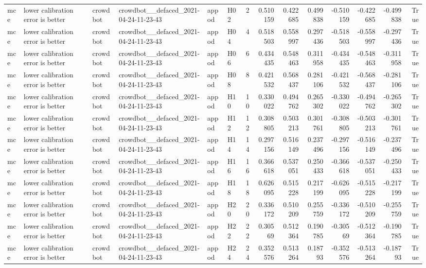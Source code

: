 \begin{longtable}{llllllrrrrrrrr}
mce & lower calibration error is better & crowdbot & crowdbot\_\_defaced\_2021-04-24-11-23-43 & appod & H02 & 2 & 0.510159 & 0.422685 & 0.499838 & -0.510159 & -0.422685 & -0.499838 & True \\
mce & lower calibration error is better & crowdbot & crowdbot\_\_defaced\_2021-04-24-11-23-43 & appod & H04 & 4 & 0.518503 & 0.558997 & 0.297436 & -0.518503 & -0.558997 & -0.297436 & True \\
mce & lower calibration error is better & crowdbot & crowdbot\_\_defaced\_2021-04-24-11-23-43 & appod & H06 & 6 & 0.434435 & 0.548463 & 0.311958 & -0.434435 & -0.548463 & -0.311958 & True \\
mce & lower calibration error is better & crowdbot & crowdbot\_\_defaced\_2021-04-24-11-23-43 & appod & H08 & 8 & 0.421532 & 0.568437 & 0.281106 & -0.421532 & -0.568437 & -0.281106 & True \\
mce & lower calibration error is better & crowdbot & crowdbot\_\_defaced\_2021-04-24-11-23-43 & appod & H10 & 10 & 0.330022 & 0.494762 & 0.265302 & -0.330022 & -0.494762 & -0.265302 & True \\
mce & lower calibration error is better & crowdbot & crowdbot\_\_defaced\_2021-04-24-11-23-43 & appod & H12 & 12 & 0.308805 & 0.503213 & 0.301761 & -0.308805 & -0.503213 & -0.301761 & True \\
mce & lower calibration error is better & crowdbot & crowdbot\_\_defaced\_2021-04-24-11-23-43 & appod & H14 & 14 & 0.297156 & 0.516149 & 0.237496 & -0.297156 & -0.516149 & -0.237496 & True \\
mce & lower calibration error is better & crowdbot & crowdbot\_\_defaced\_2021-04-24-11-23-43 & appod & H16 & 16 & 0.366618 & 0.537051 & 0.250433 & -0.366618 & -0.537051 & -0.250433 & True \\
mce & lower calibration error is better & crowdbot & crowdbot\_\_defaced\_2021-04-24-11-23-43 & appod & H18 & 18 & 0.626095 & 0.515228 & 0.217199 & -0.626095 & -0.515228 & -0.217199 & True \\
mce & lower calibration error is better & crowdbot & crowdbot\_\_defaced\_2021-04-24-11-23-43 & appod & H20 & 20 & 0.336172 & 0.510209 & 0.255759 & -0.336172 & -0.510209 & -0.255759 & True \\
mce & lower calibration error is better & crowdbot & crowdbot\_\_defaced\_2021-04-24-11-23-43 & appod & H22 & 22 & 0.30569 & 0.512364 & 0.190785 & -0.30569 & -0.512364 & -0.190785 & True \\
mce & lower calibration error is better & crowdbot & crowdbot\_\_defaced\_2021-04-24-11-23-43 & appod & H24 & 24 & 0.352576 & 0.513264 & 0.18793 & -0.352576 & -0.513264 & -0.18793 & True \\

\end{longtable}
